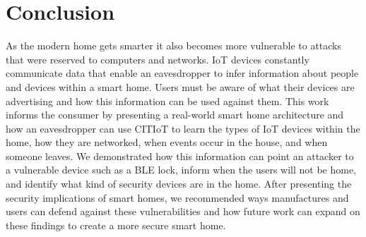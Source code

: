 \documentclass[conference]{./IEEEtran/IEEEtran}
\begin{document}
\section{Conclusion}\label{conclusion}
As the modern home gets smarter it also becomes more vulnerable to attacks that were reserved to computers and networks. \ac{IoT} devices constantly communicate data that enable an eavesdropper to infer information about people and devices within a smart home. Users must be aware of what their devices are advertising and how this information can be used against them. This work informs the consumer by presenting a real-world smart home architecture and how an eavesdropper can use CITIoT to learn the types of \ac{IoT} devices within the home, how they are networked, when events occur in the house, and when someone leaves. We demonstrated how this information can point an attacker to a vulnerable device such as a \ac{BLE} lock, inform when the users will not be home, and identify what kind of security devices are in the home. After presenting the security implications of smart homes, we recommended ways manufactures and users can defend against these vulnerabilities and how future work can expand on these findings to create a more secure smart home.
\end{document}
